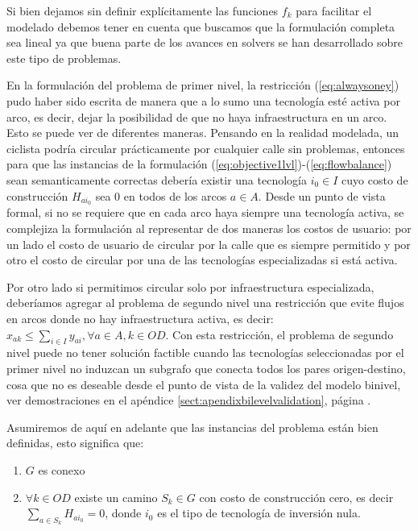 \documentclass{article}
\begin{document}

  Si bien dejamos sin definir explícitamente las funciones $f_k$ para facilitar el modelado debemos tener en cuenta que buscamos que la formulación completa sea lineal ya que buena parte de los avances en solvers se han desarrollado sobre este tipo de problemas.

  En la formulación del problema de primer nivel, la restricción (\ref{eq:alwaysoney}) pudo haber sido escrita de manera que a lo sumo una tecnología esté activa por arco, es decir, dejar la posibilidad de que no haya infraestructura en un arco. Esto se puede ver de diferentes maneras. Pensando en la realidad modelada, un ciclista podría circular prácticamente por cualquier calle sin problemas, entonces para que las instancias de la formulación (\ref{eq:objective1lvl})-(\ref{eq:flowbalance}) sean semanticamente correctas debería existir una tecnología $i_0 \in I$ cuyo costo de construcción $H_{ai_0}$ sea 0 en todos de los arcos $a \in A$. Desde un punto de vista formal, si no se requiere que en cada arco haya siempre una tecnología activa, se complejiza la formulación al representar de dos maneras los costos de usuario: por un lado el costo de usuario de circular por la calle que es siempre permitido y por otro el costo de circular por una de las tecnologías especializadas si está activa.

  Por otro lado si permitimos circular solo por infraestructura especializada, deberíamos agregar al problema de segundo nivel una restricción que evite flujos en arcos donde no hay infraestructura activa, es decir: $x_{ak} \leq \sum_{i \in I} y_{ai}, \forall a \in A, k \in OD$. Con esta restricción, el problema de segundo nivel puede no tener solución factible cuando las tecnologías seleccionadas por el primer nivel no induzcan un subgrafo que conecta todos los pares origen-destino, cosa que no es deseable desde el punto de vista de la validez del modelo binivel, ver demostraciones en el apéndice \ref{sect:apendixbilevelvalidation}, página \pageref{sect:apendixbilevelvalidation}.

  Asumiremos de aquí en adelante que las instancias del problema están bien definidas, esto significa que:

  \begin{enumerate}
    \item {$G$ es conexo}
    \item {$\forall k \in OD$ existe un camino $S_k \in G$ con costo de construcción cero, es decir $\sum_{a \in S_k} H_{ai_0} = 0$}, donde $i_0$ es el tipo de tecnología de inversión nula.
  \end{enumerate}
\end{document}
